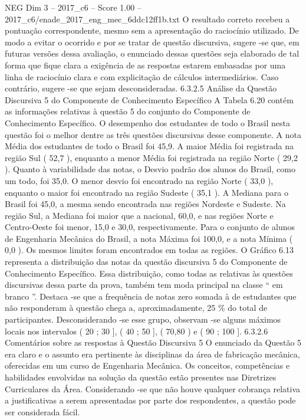 \begin{textsample}{NEG Dim 3 – 2017\_c6 – Score 1.00 – 2017\_c6/enade\_2017\_eng\_mec\_6ddc12ff1b.txt}
O resultado correto recebeu a pontuação correspondente, mesmo sem a apresentação do raciocínio utilizado.
De modo a evitar o ocorrido e por se tratar de questão discursiva, sugere -se que, em futuras versões dessa avaliação, o enunciado dessas questões seja elaborado de tal forma que fique clara a exigência de as respostas estarem embasadas por uma linha de raciocínio clara e com explicitação de cálculos intermediários.
Caso contrário, sugere -se que sejam desconsideradas. 6.3.2.5 Análise da Questão Discursiva 5 do Componente de Conhecimento Específico A Tabela 6.20 contém as informações relativas à questão 5 do conjunto do Componente de Conhecimento Específico.
O desempenho dos estudantes de todo o Brasil nesta questão foi o melhor dentre as três questões discursivas desse componente.
A nota Média dos estudantes de todo o Brasil foi 45,9.
A maior Média foi registrada na região Sul ( 52,7 ), enquanto a menor Média foi registrada na região Norte ( 29,2 ).
Quanto à variabilidade das notas, o Desvio padrão dos alunos do Brasil, como um todo, foi 35,0.
O menor desvio foi encontrado na região Norte ( 33,0 ), enquanto o maior foi encontrado na região Sudeste ( 35,1 ).
A Mediana para o Brasil foi 45,0, a mesma sendo encontrada nas regiões Nordeste e Sudeste.
Na região Sul, a Mediana foi maior que a nacional, 60,0, e nas regiões Norte e Centro-Oeste foi menor, 15,0 e 30,0, respectivamente.
Para o conjunto de alunos de Engenharia Mecânica do Brasil, a nota Máxima foi 100,0, e a nota Mínima ( 0,0 ).
Os mesmos limites foram encontrados em todas as regiões.
O Gráfico 6.13 representa a distribuição das notas da questão discursiva 5 do Componente de Conhecimento Específico.
Essa distribuição, como todas as relativas às questões discursivas dessa parte da prova, também tem moda principal na classe “ em branco ”.
Destaca -se que a frequência de notas zero somada à de estudantes que não responderam à questão chega a, aproximadamente, 25 \% do total de participantes.
Desconsiderando -se esse grupo, observam -se alguns máximos locais nos intervalos ( 20 ; 30 ], ( 40 ; 50 ], ( 70,80 ) e ( 90 ; 100 ]. 6.3.2.6 Comentários sobre as respostas à Questão Discursiva 5 O enunciado da Questão 5 era claro e o assunto era pertinente às disciplinas da área de fabricação mecânica, oferecidas em um curso de Engenharia Mecânica.
Os conceitos, competências e habilidades envolvidas na solução da questão estão presentes nas Diretrizes Curriculares da Área.
Considerando -se que não houve qualquer cobrança relativa a justificativas a serem apresentadas por parte dos respondentes, a questão pode ser considerada fácil.

\end{textsample}
